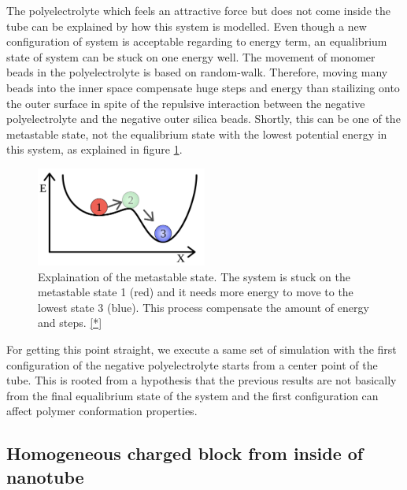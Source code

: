 The polyelectrolyte which feels an attractive force but does not come inside the tube can be explained by how this system is modelled. Even though a new configuration of system is acceptable regarding to energy term, an equalibrium state of system can be stuck on one energy well. The movement of monomer beads in the polyelectrolyte is based on random-walk. Therefore, moving many beads into the inner space compensate huge steps and energy than stailizing onto the outer surface in spite of the repulsive interaction between the negative polyelectrolyte and the negative outer silica beads. Shortly, this can be one of the metastable state, not the equalibrium state with the lowest potential energy in this system, as explained in figure \ref{fig:metastable}.\\

    \begin{figure}[h!]
      \centering
        \includegraphics[width=0.5\textwidth]{fig/metastable.png}
     \caption{Explaination of the metastable state. The system is stuck on the metastable state 1 (red) and it needs more energy to move to the lowest state 3 (blue). This process compensate the amount of energy and steps. \ref{*}}
    \label{fig:metastable}
    \end{figure}

For getting this point straight, we execute a same set of simulation with the first configuration of the negative polyelectrolyte starts from a center point of the tube. This is rooted from a hypothesis that the previous results are not basically from the final equalibrium state of the system and the first configuration can affect polymer conformation properties.

\clearpage
\subsection{Homogeneous charged block from inside of nanotube}


